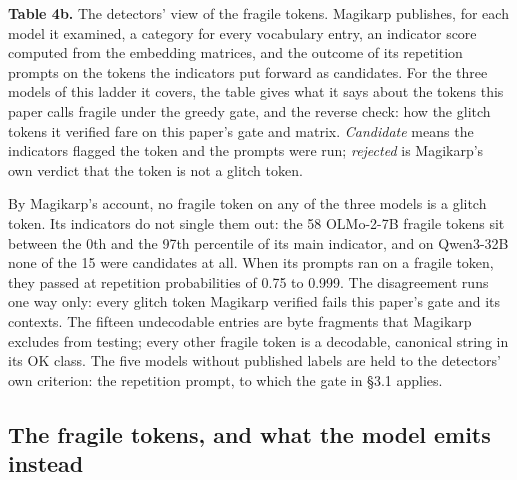 \documentclass[11pt]{article}
\newenvironment{tabcaption}{\par\vspace{3pt}\small\setlength{\parindent}{0pt}\ignorespaces}{\par\vspace{14pt}}
\begin{document}
\begin{tabcaption}
\textbf{Table 4b.} The detectors' view of the fragile tokens. Magikarp \citep{land2024} publishes, for each model it examined, a category for every vocabulary entry, an indicator score computed from the embedding matrices, and the outcome of its repetition prompts on the tokens the indicators put forward as candidates. For the three models of this ladder it covers, the table gives what it says about the tokens this paper calls fragile under the greedy gate, and the reverse check: how the glitch tokens it verified fare on this paper's gate and matrix. \emph{Candidate} means the indicators flagged the token and the prompts were run; \emph{rejected} is Magikarp's own verdict that the token is not a glitch token.
\end{tabcaption}

By Magikarp's account, no fragile token on any of the three models is a glitch token. Its indicators do not single them out: the 58 OLMo-2-7B fragile tokens sit between the 0th and the 97th percentile of its main indicator, and on Qwen3-32B none of the 15 were candidates at all. When its prompts ran on a fragile token, they passed at repetition probabilities of 0.75 to 0.999. The disagreement runs one way only: every glitch token Magikarp verified fails this paper's gate and its contexts. The fifteen undecodable entries are byte fragments that Magikarp excludes from testing; every other fragile token is a decodable, canonical string in its OK class. The five models without published labels are held to the detectors' own criterion: the repetition prompt, to which the gate in §3.1 applies.

\subsection{The fragile tokens, and what the model emits instead}\label{the-fragile-tokens-and-what-the-model-emits-instead}

\begingroup\scriptsize\setlength{\tabcolsep}{4pt}\renewcommand{\arraystretch}{1.15}
\end{document}
